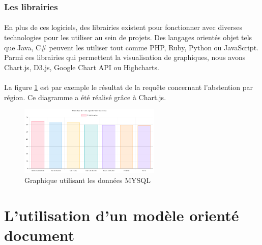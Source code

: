 \subsubsection{Les librairies}
\paragraph{}En plus de ces logiciels, des librairies existent pour fonctionner avec diverses technologies pour les utiliser au sein de projets. Des langages orientés objet tels que Java, C\# peuvent les utiliser tout comme PHP, Ruby, Python ou JavaScript. Parmi ces librairies qui permettent la visualisation de graphiques, nous avons Chart.js, D3.js, Google Chart API ou Highcharts.

\paragraph{}La figure \ref{fig:graphMySQL} est par exemple le résultat de la requête concernant l'abstention par région. Ce diagramme a été réalisé grâce à Chart.js.

\begin{figure}[!htp]
  \centering
  \includegraphics[width=0.6\textwidth]{./src_img/chartMySQLData.png}
  \caption{Graphique utilisant les données MYSQL}
  \label{fig:graphMySQL}
\end{figure}



\section{L'utilisation d'un modèle orienté document}

